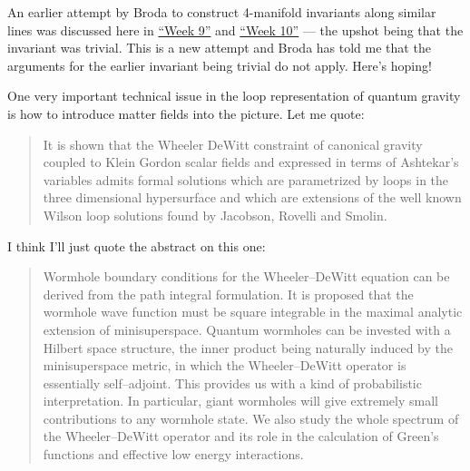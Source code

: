 \documentclass[12pt]{article}
\def\tightlist{}
\renewcommand{\texttt}[1]{%
  \begingroup
  \ttfamily
  \begingroup\lccode`~=`/\lowercase{\endgroup\def~}{/\discretionary{}{}{}}%
  \begingroup\lccode`~=`[\lowercase{\endgroup\def~}{[\discretionary{}{}{}}%
  \begingroup\lccode`~=`.\lowercase{\endgroup\def~}{.\discretionary{}{}{}}%
  \catcode`/=\active\catcode`[=\active\catcode`.=\active
  \scantokens{#1\noexpand}%
  \endgroup
}
\begin{document}
\noindent
An earlier attempt by Broda to construct 4-manifold invariants along
similar lines was discussed here in \protect\hyperlink{week9}{``Week
9''} and \protect\hyperlink{week10}{``Week 10''} --- the upshot being
that the invariant was trivial. This is a new attempt and Broda has told
me that the arguments for the earlier invariant being trivial do not
apply. Here's hoping!

\noindent
One very important technical issue in the loop representation of quantum
gravity is how to introduce matter fields into the picture. Let me quote:

\begin{quote}
It is shown that the Wheeler DeWitt constraint of canonical gravity
coupled to Klein Gordon scalar fields and expressed in terms of
Ashtekar's variables admits formal solutions which are parametrized by
loops in the three dimensional hypersurface and which are extensions of
the well known Wilson loop solutions found by Jacobson, Rovelli and
Smolin.
\end{quote}

\noindent
I think I'll just quote the abstract on this one:

\begin{quote}
Wormhole boundary conditions for the Wheeler--DeWitt equation can be
derived from the path integral formulation. It is proposed that the
wormhole wave function must be square integrable in the maximal analytic
extension of minisuperspace. Quantum wormholes can be invested with a
Hilbert space structure, the inner product being naturally induced by
the minisuperspace metric, in which the Wheeler--DeWitt operator is
essentially self--adjoint. This provides us with a kind of probabilistic
interpretation. In particular, giant wormholes will give extremely small
contributions to any wormhole state. We also study the whole spectrum of
the Wheeler--DeWitt operator and its role in the calculation of Green's
functions and effective low energy interactions.
\end{quote}
\end{document}
